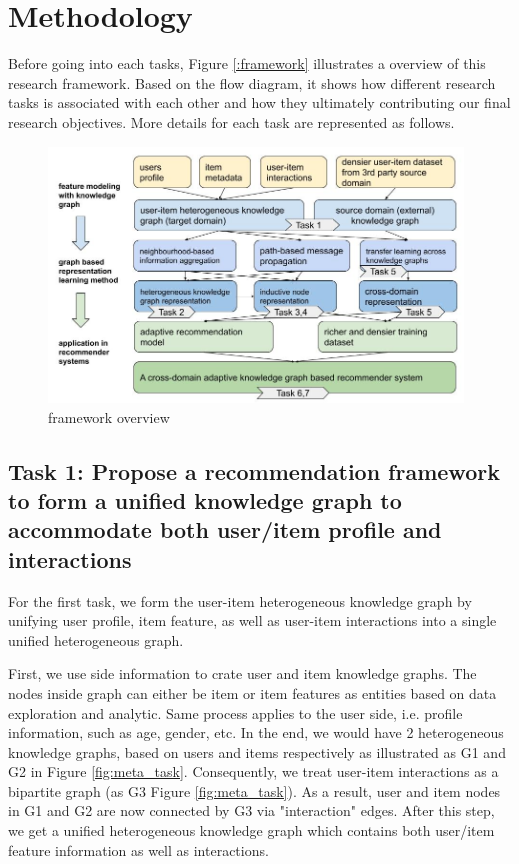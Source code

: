 \section{Methodology}

Before going into each tasks, Figure \ref{:framework} illustrates a overview of this research framework. Based on the flow diagram, it shows how different research tasks is associated with each other and how they ultimately contributing our final research objectives. More details for each task are represented as follows.

\begin{figure}[!ht]
    \centering
    \includegraphics[width=0.98\textwidth]{figs/framework_overview.jpg}
    \caption{framework overview}\label{fig:framework}
\end{figure}

\subsection*{Task 1: Propose a recommendation framework to form a unified knowledge graph to accommodate both user/item profile and interactions}

For the first task, we form the user-item heterogeneous knowledge graph by unifying user profile, item feature, as well as user-item interactions into a single unified heterogeneous graph.

First, we use side information to crate user and item knowledge graphs. The nodes inside graph can either be item or item features as entities based on data exploration and analytic. Same process applies to the user side, i.e. profile information, such as age, gender, etc. In the end, we would have 2 heterogeneous knowledge graphs, based on users and items respectively as illustrated as G1 and G2 in Figure \ref{fig:meta_task}.
Consequently, we treat user-item interactions as a bipartite graph (as G3 Figure \ref{fig:meta_task}). As a result, user and item nodes in G1 and G2 are now connected by G3 via "interaction" edges. After this step, we get a unified heterogeneous knowledge graph which contains both user/item feature information as well as interactions.


